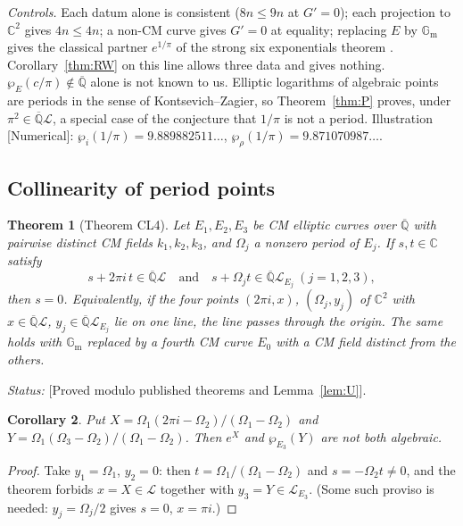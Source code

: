 \documentclass[11pt]{amsart}
\newtheorem{theorem}{Theorem}[section]
\newtheorem{corollary}[theorem]{Corollary}
\theoremstyle{definition}
\newcommand{\Qb}{\overline{\mathbb{Q}}}
\newcommand{\C}{\mathbb{C}}
\newcommand{\Gm}{\mathbb{G}_{\mathrm m}}
\newcommand{\Lg}{\mathcal{L}}
\newcommand{\lab}[1]{\textup{[#1]}}
\newcommand{\LabC}{\lab{Proved modulo published theorems and Lemma~\ref{lem:U}}}
\newcommand{\Status}{\noindent\emph{Status:} }
\begin{document}
\noindent\emph{Controls.} Each datum alone is consistent ($8n\le9n$ at $G'=0$); each projection to $\C^2$ gives $4n\le4n$; a
non-CM curve gives $G'=0$ at equality; replacing $E$ by $\Gm$ gives the classical partner $e^{1/\pi}$ of the strong six
exponentials theorem \cite[Cor.~1(3)]{Di07}. Corollary~\ref{thm:RW} on this line allows three data and gives nothing.
$\wp_E(c/\pi)\notin\Qb$ alone is not known to us. Elliptic logarithms of algebraic points are periods in the sense of
Kontsevich--Zagier, so Theorem~\ref{thm:P} proves, under $\pi^2\in\Qb\Lg$, a special case of the conjecture that $1/\pi$ is
not a period. Illustration \lab{Numerical}: $\wp_i(1/\pi)=9.889882511\ldots$, $\wp_\rho(1/\pi)=9.871070987\ldots$.

\subsection{Collinearity of period points}\label{sec:CL4}

\begin{theorem}[Theorem CL4]\label{thm:CL4}
Let $E_1,E_2,E_3$ be CM elliptic curves over $\Qb$ with pairwise distinct CM fields $k_1,k_2,k_3$, and $\Omega_j$ a nonzero
period of $E_j$. If $s,t\in\C$ satisfy
\[
s+2\pi i\,t\in\Qb\Lg\quad\text{and}\quad s+\Omega_jt\in\Qb\Lg_{E_j}\ (j=1,2,3),
\]
then $s=0$. Equivalently, if the four points $(2\pi i,x)$, $(\Omega_j,y_j)$ of $\C^2$ with $x\in\Qb\Lg$, $y_j\in\Qb\Lg_{E_j}$ lie on
one line, the line passes through the origin. The same holds with $\Gm$ replaced by a fourth CM curve $E_0$ with a CM field
distinct from the others.
\end{theorem}

\Status \LabC.

\begin{corollary}\label{cor:CL4}
Put $X=\Omega_1(2\pi i-\Omega_2)/(\Omega_1-\Omega_2)$ and $Y=\Omega_1(\Omega_3-\Omega_2)/(\Omega_1-\Omega_2)$. Then $e^X$ and
$\wp_{E_3}(Y)$ are not both algebraic.
\end{corollary}

\begin{proof}
Take $y_1=\Omega_1$, $y_2=0$: then $t=\Omega_1/(\Omega_1-\Omega_2)$ and $s=-\Omega_2t\ne0$, and the theorem forbids $x=X\in\Lg$
together with $y_3=Y\in\Lg_{E_3}$. (Some such proviso is needed: $y_j=\Omega_j/2$ gives $s=0$, $x=\pi i$.)
\end{proof}
\end{document}
